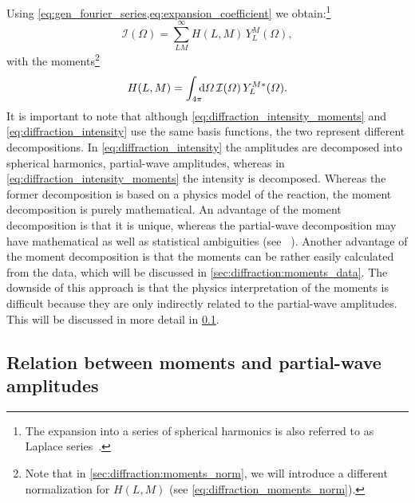 Using \cref{eq:gen_fourier_series,eq:expansion_coefficient} we
obtain:\footnote{The expansion into a series of spherical harmonics is
also referred to as Laplace series~\cite{MathWorld:LaplaceSeries}.}
\begin{equation}
  \label{eq:diffraction_intensity_moments}
  \mathcal{I}(\Omega)
  = \sum_{L M}^\infty H(L, M)\, Y_L^M(\Omega),
\end{equation}
with the moments\footnote{Note that in
\cref{sec:diffraction:moments_norm}, we will introduce a different
normalization for $H(L, M)$ (see \cref{eq:diffraction_moments_norm}).}
\begin{equation}
  \label{eq:diffraction_moments}
  H(L, M)
  = \int_{4 \pi}\!\!\! \dif{\Omega}\, \mathcal{I}(\Omega)\, Y_L^{M *}(\Omega).
\end{equation}
It is important to note that although
\cref{eq:diffraction_intensity_moments} and
\cref{eq:diffraction_intensity} use the same basis functions, the two
represent different decompositions.  In
\cref{eq:diffraction_intensity} the amplitudes are decomposed into
spherical harmonics, \ie partial-wave amplitudes, whereas in
\cref{eq:diffraction_intensity_moments} the intensity is decomposed.
Whereas the former decomposition is based on a physics model of the
reaction, the moment decomposition is purely mathematical.  An
advantage of the moment decomposition is that it is unique, whereas
the partial-wave decomposition may have mathematical as well as
statistical ambiguities (see \eg\ ).  Another
advantage of the moment decomposition is that the moments can be
rather easily calculated from the data, which will be discussed in
\cref{sec:diffraction:moments_data}.  The downside of this approach is
that the physics interpretation of the moments is difficult because
they are only indirectly related to the partial-wave amplitudes.  This
will be discussed in more detail in \cref{sec:diffraction:moments_pw}.


\subsection{Relation between moments and partial-wave amplitudes}%
\label{sec:diffraction:moments_pw}


